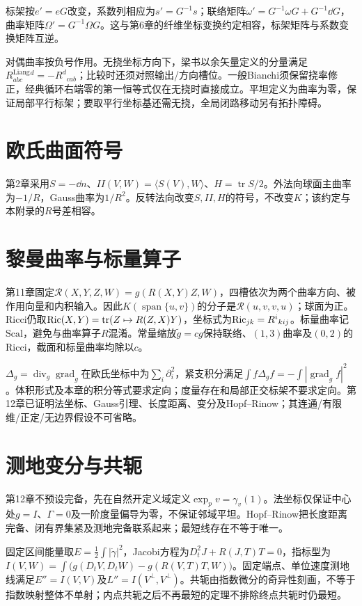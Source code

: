 标架按$e'=eG$改变，系数列相应为$s'=G^{-1}s$；联络矩阵$\omega'=G^{-1}\omega G+G^{-1}\dd G$，曲率矩阵$\Omega'=G^{-1}\Omega G$。这与第6章的纤维坐标变换约定相容，标架矩阵与系数变换矩阵互逆。

对偶曲率按负号作用。无挠坐标方向下，梁书以余矢量定义的分量满足$R^{\mathrm{Liang}}_{abc}{}^d=-R^d{}_{cab}$；比较时还须对照输出/方向槽位。一般Bianchi须保留挠率修正，经典循环右端零的第一恒等式仅在无挠时直接成立。平坦定义为曲率为零，保证局部平行标架；要取平行坐标基还需无挠，全局闭路移动另有拓扑障碍。

\section{欧氏曲面符号}
第2章采用$S=-\dd n$、$II(V,W)=\langle S(V),W\rangle$、$H=\operatorname{tr}S/2$。外法向球面主曲率为$-1/R$，Gauss曲率为$1/R^2$。反转法向改变$S,II,H$的符号，不改变$K$；该约定与本附录的$R$号差相容。


\section{黎曼曲率与标量算子}
第11章固定$\mathcal R(X,Y,Z,W)=g(R(X,Y)Z,W)$，四槽依次为两个曲率方向、被作用向量和内积输入。因此$K(\operatorname{span}\{u,v\})$的分子是$\mathcal R(u,v,v,u)$；球面为正。Ricci仍取$\operatorname{Ric}(X,Y)=\operatorname{tr}(Z\mapsto R(Z,X)Y)$，坐标式为$\operatorname{Ric}_{jk}=R^i{}_{kij}$。标量曲率记$\mathrm{Scal}$，避免与曲率算子$R$混淆。常量缩放$\widetilde g=cg$保持联络、$(1,3)$曲率及$(0,2)$的Ricci，截面和标量曲率均除以$c$。

$\Delta_g=\operatorname{div}_g\operatorname{grad}_g$在欧氏坐标中为$\sum_i\partial_i^2$，紧支积分满足$\int f\Delta_g f=-\int|\operatorname{grad}_g f|^2$。体积形式及本章的积分等式要求定向；度量存在和局部正交标架不要求定向。第12章已证明法坐标、Gauss引理、长度距离、变分及Hopf--Rinow；其连通/有限维/正定/无边界假设不可省略。


\section{测地变分与共轭}
第12章不预设完备，先在自然开定义域定义$\exp_pv=\gamma_v(1)$。法坐标仅保证中心处$g=I$、$\Gamma=0$及一阶度量偏导为零，不保证邻域平坦。Hopf--Rinow把长度距离完备、闭有界集紧及测地完备联系起来；最短线存在不等于唯一。

固定区间能量取$E=\tfrac12\int|\dot\gamma|^2$，Jacobi方程为$D_t^2J+R(J,T)T=0$，指标型为$I(V,W)=\int\bigl(g(D_tV,D_tW)-g(R(V,T)T,W)\bigr)$。固定端点、单位速度测地线满足$E''=I(V,V)$及$L''=I(V^\perp,V^\perp)$。共轭由指数微分的奇异性刻画，不等于指数映射整体不单射；内点共轭之后不再最短的定理不排除终点共轭时仍最短。


